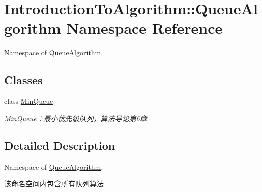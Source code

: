 \hypertarget{namespace_introduction_to_algorithm_1_1_queue_algorithm}{}\section{Introduction\+To\+Algorithm\+:\+:Queue\+Algorithm Namespace Reference}
\label{namespace_introduction_to_algorithm_1_1_queue_algorithm}


Namespace of \hyperlink{namespace_introduction_to_algorithm_1_1_queue_algorithm}{Queue\+Algorithm}.  


\subsection*{Classes}
\begin{DoxyCompactItemize}
\item 
class \hyperlink{class_introduction_to_algorithm_1_1_queue_algorithm_1_1_min_queue}{Min\+Queue}
\begin{DoxyCompactList}\small\item\em Min\+Queue：最小优先级队列，算法导论第6章 \end{DoxyCompactList}\end{DoxyCompactItemize}


\subsection{Detailed Description}
Namespace of \hyperlink{namespace_introduction_to_algorithm_1_1_queue_algorithm}{Queue\+Algorithm}. 

该命名空间内包含所有队列算法 